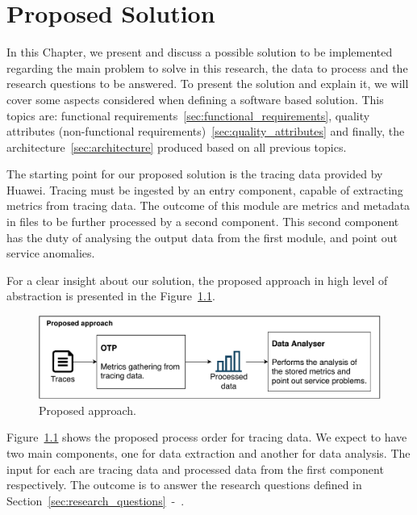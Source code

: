 \glsresetall
\chapter{Proposed Solution}
\label{chap:proposed_solution}

In this Chapter, we present and discuss a possible solution to be implemented regarding the main problem to solve in this research, the data to process and the research questions to be answered. To present the solution and explain it, we will cover some aspects considered when defining a software based solution. This topics are: functional requirements~\ref{sec:functional_requirements}, quality attributes (non-functional requirements)~\ref{sec:quality_attributes} and finally, the architecture~\ref{sec:architecture} produced based on all previous topics.

The starting point for our proposed solution is the tracing data provided by Huawei. Tracing must be ingested by an entry component, capable of extracting metrics from tracing data. The outcome of this module are metrics and metadata in files to be further processed by a second component. This second component has the duty of analysing the output data from the first module, and point out service anomalies.

For a clear insight about our solution, the proposed approach in high level of abstraction is presented in the Figure~\ref{fig:proposed_approach}.

\begin{figure}[H]
    \centering
    \includegraphics[width=1.00\textwidth]{images/proposed_solution.pdf}
    \caption{Proposed approach.}
    \label{fig:proposed_approach}
\end{figure}

Figure~\ref{fig:proposed_approach} shows the proposed process order for tracing data. We expect to have two main components, one for data extraction and another for data analysis. The input for each are tracing data and processed data from the first component respectively. The outcome is to answer the research questions defined in Section~\ref{sec:research_questions}~-~.

